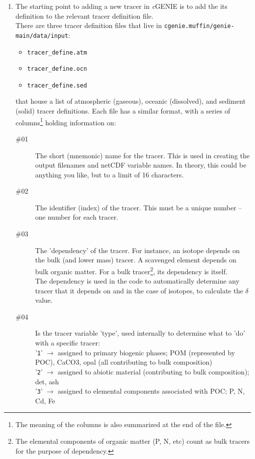 \documentclass[10pt,twoside]{article}
\begin{document}
\begin{enumerate}
\item 
The starting point to adding a new tracer in \textit{c}GENIE is to add the its definition to the relevant tracer definition file.
\\There are three tracer definition files that live in \texttt{cgenie.muffin/genie-main/data/input}:
\begin{itemize}
\item \texttt{tracer\_define.atm}
\item \texttt{tracer\_define.ocn}
\item \texttt{tracer\_define.sed}
\end{itemize}
that house a list of atmospheric (gaseous), oceanic (dissolved), and sediment (solid) tracer definitions.
Each file has a similar format, with a series of columns\footnote{The meaning of the columns is also summarized at the end of the file.} holding information on:
\begin{description}
\item[\#01] The short (mnemonic) name for the tracer. This is used in creating the output filenames and netCDF variable names. In theory, this could be anything you like, but to a limit of 16 characters.
\item[\#02] The identifier (index) of the tracer. This must be a unique number -- one number for each tracer.
\item[\#03] The 'dependency' of the tracer. For instance, an isotope depends on the bulk (and lower mass) tracer. A scavenged element depends on bulk organic matter. For a bulk tracer\footnote{The elemental components of organic matter (P, N, etc) count as bulk tracers for the purpose of dependency.}, its dependency is itself. \\The dependency is used in the code to automatically determine any tracer that it depends on and in the case of isotopes, to calculate the \(\delta\) value.
\item[\#04] Is the tracer variable 'type', used internally to determine what to 'do' with a specific tracer:
    \\'\texttt{1}' \(\rightarrow\) assigned to primary biogenic phases; POM (represented by POC), CaCO3, opal (all contributing to bulk composition)
    \\'\texttt{2}' \(\rightarrow\) assigned to abiotic material (contributing to bulk composition); det, ash
    \\'\texttt{3}' \(\rightarrow\) assigned to elemental components associated with POC; P, N, Cd, Fe

\end{description}
\end{enumerate}
\end{document}

